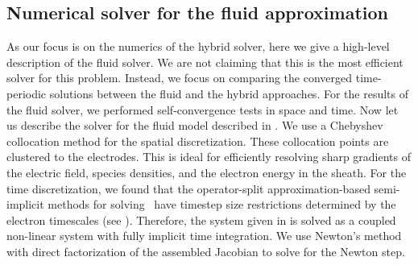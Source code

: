 \subsection{Numerical solver for the fluid approximation}
\label{subsec:fluid_solver}
As our focus is on the numerics of the hybrid solver, here we give a high-level description of the fluid solver. We are not claiming that this is the most efficient solver for this problem. Instead, we focus on comparing the converged time-periodic solutions between the fluid and the hybrid approaches. For the results of the fluid solver, we performed self-convergence tests in space and time. Now let us describe the solver for the fluid model described in . We use a Chebyshev collocation method for the spatial discretization. These collocation points are clustered to the electrodes. This is ideal for efficiently resolving sharp gradients of the electric field, species densities, and the electron energy in the sheath.  
For the time discretization, we found that the operator-split approximation-based semi-implicit methods for solving~ have timestep size restrictions determined by the electron timescales (see ). Therefore, the system given in  is solved as a coupled non-linear system with fully implicit time integration. We use Newton's method with direct factorization of the assembled Jacobian to solve for the Newton step. 




